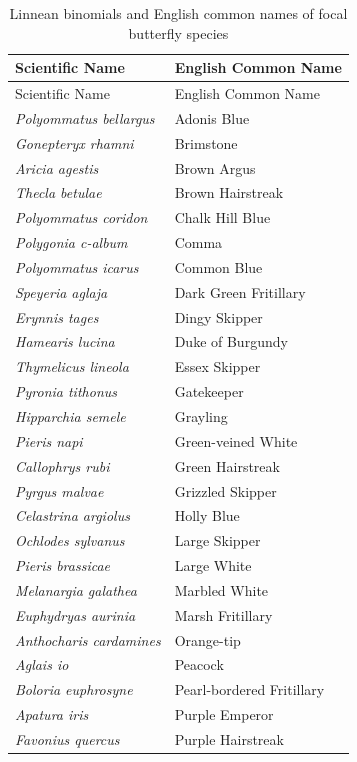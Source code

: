 \documentclass[
]{article}
\begin{document}
\begin{longtable}[]{@{}ll@{}}
\caption{Linnean binomials and English common names of focal butterfly
species}\tabularnewline
\toprule
Scientific Name & English Common Name \\
\midrule
\endfirsthead
\toprule
Scientific Name & English Common Name \\
\midrule
\endhead
\textit{Polyommatus bellargus} & Adonis Blue \\
\textit{Gonepteryx rhamni} & Brimstone \\
\textit{Aricia agestis} & Brown Argus \\
\textit{Thecla betulae} & Brown Hairstreak \\
\textit{Polyommatus coridon} & Chalk Hill Blue \\
\textit{Polygonia c-album} & Comma \\
\textit{Polyommatus icarus} & Common Blue \\
\textit{Speyeria aglaja} & Dark Green Fritillary \\
\textit{Erynnis tages} & Dingy Skipper \\
\textit{Hamearis lucina} & Duke of Burgundy \\
\textit{Thymelicus lineola} & Essex Skipper \\
\textit{Pyronia tithonus} & Gatekeeper \\
\textit{Hipparchia semele} & Grayling \\
\textit{Pieris napi} & Green-veined White \\
\textit{Callophrys rubi} & Green Hairstreak \\
\textit{Pyrgus malvae} & Grizzled Skipper \\
\textit{Celastrina argiolus} & Holly Blue \\
\textit{Ochlodes sylvanus} & Large Skipper \\
\textit{Pieris brassicae} & Large White \\
\textit{Melanargia galathea} & Marbled White \\
\textit{Euphydryas aurinia} & Marsh Fritillary \\
\textit{Anthocharis cardamines} & Orange-tip \\
\textit{Aglais io} & Peacock \\
\textit{Boloria euphrosyne} & Pearl-bordered Fritillary \\
\textit{Apatura iris} & Purple Emperor \\
\textit{Favonius quercus} & Purple Hairstreak \\

\end{longtable}
\end{document}
